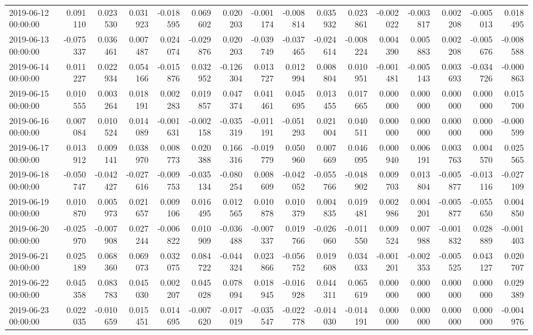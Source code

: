 \begin{tabular}{lrrrrrrrrrrrrrrr}
2019-06-12 00:00:00 & 0.091110 & 0.023530 & 0.031923 & -0.018595 & 0.069602 & 0.020203 & -0.001174 & -0.008814 & 0.035932 & 0.023861 & -0.002022 & -0.003817 & 0.002208 & -0.005013 & 0.018495 \\
2019-06-13 00:00:00 & -0.075337 & 0.036461 & 0.007487 & 0.024074 & -0.029876 & 0.020203 & -0.039749 & -0.037465 & -0.024614 & -0.008224 & 0.004390 & 0.005883 & 0.002208 & -0.005676 & -0.008588 \\
2019-06-14 00:00:00 & 0.011227 & 0.022934 & 0.054166 & -0.015876 & 0.032952 & -0.126304 & 0.013727 & 0.012994 & 0.008804 & 0.010951 & -0.001481 & -0.005143 & 0.003693 & -0.034726 & -0.000863 \\
2019-06-15 00:00:00 & 0.010555 & 0.003264 & 0.018191 & 0.002283 & 0.019857 & 0.047374 & 0.041461 & 0.045695 & 0.013455 & 0.017665 & 0.000000 & 0.000000 & 0.000000 & 0.000000 & 0.015700 \\
2019-06-16 00:00:00 & 0.007084 & 0.010524 & 0.014089 & -0.001631 & -0.002158 & -0.035319 & -0.011191 & -0.051293 & 0.021004 & 0.040511 & 0.000000 & 0.000000 & 0.000000 & 0.000000 & -0.000599 \\
2019-06-17 00:00:00 & 0.013912 & 0.009141 & 0.038970 & 0.008773 & 0.020388 & 0.166316 & -0.019779 & 0.050960 & 0.007669 & 0.046095 & 0.000940 & 0.006191 & 0.003763 & 0.004570 & 0.025565 \\
2019-06-18 00:00:00 & -0.050747 & -0.042427 & -0.027616 & -0.009753 & -0.035134 & -0.080254 & 0.008609 & -0.042052 & -0.055766 & -0.048902 & 0.009703 & 0.013804 & -0.005877 & -0.013116 & -0.027109 \\
2019-06-19 00:00:00 & 0.010870 & 0.005973 & 0.021657 & 0.009106 & 0.016495 & 0.012565 & 0.010878 & 0.010379 & 0.004835 & 0.019481 & 0.002986 & 0.004201 & -0.005877 & -0.055650 & 0.004850 \\
2019-06-20 00:00:00 & -0.025970 & -0.007908 & 0.027244 & -0.006822 & 0.010909 & -0.036488 & -0.007337 & 0.019766 & -0.026060 & -0.011550 & 0.009524 & 0.007988 & -0.001832 & 0.028889 & -0.001403 \\
2019-06-21 00:00:00 & 0.025189 & 0.068360 & 0.069073 & 0.032075 & 0.084722 & -0.044324 & 0.023866 & -0.056752 & 0.019608 & 0.034033 & -0.001201 & -0.002353 & -0.005525 & 0.043127 & 0.020707 \\
2019-06-22 00:00:00 & 0.045358 & 0.083783 & 0.045030 & 0.002207 & 0.045028 & 0.078094 & 0.018945 & -0.016928 & 0.044311 & 0.065619 & 0.000000 & 0.000000 & 0.000000 & 0.000000 & 0.029389 \\
2019-06-23 00:00:00 & 0.022035 & -0.010659 & 0.015451 & 0.014695 & -0.007620 & -0.017019 & -0.035547 & -0.022778 & -0.014030 & -0.014191 & 0.000000 & 0.000000 & 0.000000 & 0.000000 & -0.004976 \\

\end{tabular}
